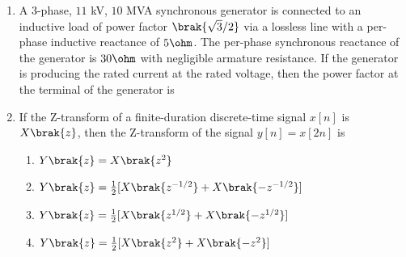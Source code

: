 \documentclass[journal,12pt,onecolumn]{IEEEtran}
\theoremstyle{remark}
\begin{document}
\begin{enumerate}[start=1, label=Q.\arabic*]
    \hfill{}

     \item A 3-phase, $11$ kV, $10$ MVA synchronous generator is connected to an inductive load of power factor $\brak{\sqrt{3}/2}$ via a lossless line with a per-phase inductive reactance of $5 \ohm$. The per-phase synchronous reactance of the generator is $30 \ohm$ with negligible armature resistance. If the generator is producing the rated current at the rated voltage, then the power factor at the terminal of the generator is
    \begin{enumerate}
    \end{enumerate}

    \hfill{}

     \item If the Z-transform of a finite-duration discrete-time signal $x[n]$ is $X\brak{z}$, then the Z-transform of the signal $y[n] = x[2n]$ is
    \begin{enumerate}
        \item $Y\brak{z} = X\brak{z^2}$
        \item $Y\brak{z} = \frac{1}{2}[X\brak{z^{-1/2}} + X\brak{-z^{-1/2}}]$
        \item $Y\brak{z} = \frac{1}{2}[X\brak{z^{1/2}} + X\brak{-z^{1/2}}]$
        \item $Y\brak{z} = \frac{1}{2}[X\brak{z^2} + X\brak{-z^2}]$
    \end{enumerate}

    \hfill{}


\end{enumerate}
\end{document}

